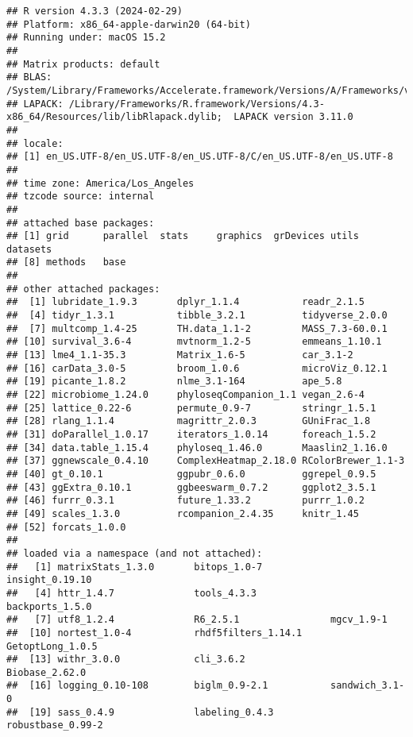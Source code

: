 \documentclass[
]{article}
\begin{document}
\begin{verbatim}
## R version 4.3.3 (2024-02-29)
## Platform: x86_64-apple-darwin20 (64-bit)
## Running under: macOS 15.2
## 
## Matrix products: default
## BLAS:   /System/Library/Frameworks/Accelerate.framework/Versions/A/Frameworks/vecLib.framework/Versions/A/libBLAS.dylib 
## LAPACK: /Library/Frameworks/R.framework/Versions/4.3-x86_64/Resources/lib/libRlapack.dylib;  LAPACK version 3.11.0
## 
## locale:
## [1] en_US.UTF-8/en_US.UTF-8/en_US.UTF-8/C/en_US.UTF-8/en_US.UTF-8
## 
## time zone: America/Los_Angeles
## tzcode source: internal
## 
## attached base packages:
## [1] grid      parallel  stats     graphics  grDevices utils     datasets 
## [8] methods   base     
## 
## other attached packages:
##  [1] lubridate_1.9.3       dplyr_1.1.4           readr_2.1.5          
##  [4] tidyr_1.3.1           tibble_3.2.1          tidyverse_2.0.0      
##  [7] multcomp_1.4-25       TH.data_1.1-2         MASS_7.3-60.0.1      
## [10] survival_3.6-4        mvtnorm_1.2-5         emmeans_1.10.1       
## [13] lme4_1.1-35.3         Matrix_1.6-5          car_3.1-2            
## [16] carData_3.0-5         broom_1.0.6           microViz_0.12.1      
## [19] picante_1.8.2         nlme_3.1-164          ape_5.8              
## [22] microbiome_1.24.0     phyloseqCompanion_1.1 vegan_2.6-4          
## [25] lattice_0.22-6        permute_0.9-7         stringr_1.5.1        
## [28] rlang_1.1.4           magrittr_2.0.3        GUniFrac_1.8         
## [31] doParallel_1.0.17     iterators_1.0.14      foreach_1.5.2        
## [34] data.table_1.15.4     phyloseq_1.46.0       Maaslin2_1.16.0      
## [37] ggnewscale_0.4.10     ComplexHeatmap_2.18.0 RColorBrewer_1.1-3   
## [40] gt_0.10.1             ggpubr_0.6.0          ggrepel_0.9.5        
## [43] ggExtra_0.10.1        ggbeeswarm_0.7.2      ggplot2_3.5.1        
## [46] furrr_0.3.1           future_1.33.2         purrr_1.0.2          
## [49] scales_1.3.0          rcompanion_2.4.35     knitr_1.45           
## [52] forcats_1.0.0        
## 
## loaded via a namespace (and not attached):
##   [1] matrixStats_1.3.0       bitops_1.0-7            insight_0.19.10        
##   [4] httr_1.4.7              tools_4.3.3             backports_1.5.0        
##   [7] utf8_1.2.4              R6_2.5.1                mgcv_1.9-1             
##  [10] nortest_1.0-4           rhdf5filters_1.14.1     GetoptLong_1.0.5       
##  [13] withr_3.0.0             cli_3.6.2               Biobase_2.62.0         
##  [16] logging_0.10-108        biglm_0.9-2.1           sandwich_3.1-0         
##  [19] sass_0.4.9              labeling_0.4.3          robustbase_0.99-2      

\end{verbatim}
\end{document}
